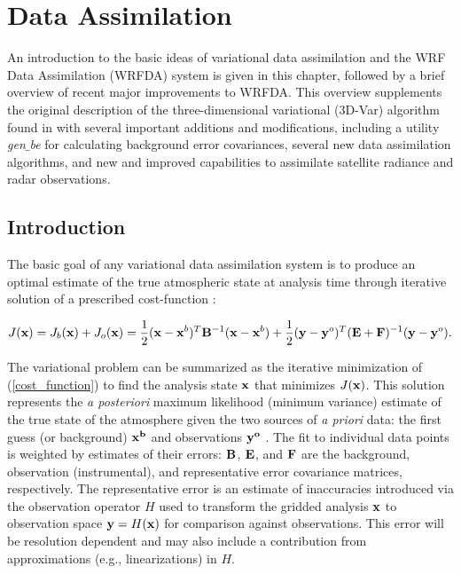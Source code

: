 \chapter{Data Assimilation}
\label{var_chap}

An introduction to the basic ideas of variational data assimilation and
the WRF Data Assimilation (WRFDA) system \citep{barker12} is given in this chapter, followed by a brief
overview of recent major improvements to WRFDA.  This overview
supplements the original description of the three-dimensional
variational (3D-Var) algorithm found in \citet{barker04} with
several important additions and modifications, including a utility {\it gen$\_$be}
for calculating background error covariances, several new data assimilation algorithms, and
new and improved capabilities to assimilate satellite radiance and radar observations.

\section{Introduction}
\label{var-intro}

The basic goal of any variational data assimilation system is to produce
an optimal estimate of the true atmospheric state at analysis time
through iterative solution of a prescribed cost-function \citep{ide97}:

\begin{equation}
J({\bf x}) = J_b({\bf x}) + J_o({\bf x}) = \frac{1}{2 
} ({\bf x}-{\bf x}^{b})^{T}{\bf B}^{-1}({\bf x}-{\bf x}^{b}) + 
\frac{1}{2}
({\bf y}-{\bf y}^{o})^{T}({\bf E+F})^{-1}({\bf y}-{\bf y}^{o}).
\label{cost_function}
\end{equation}

The variational problem can be summarized as the iterative minimization
of (\ref{cost_function}) to find the analysis state ${\bf x}$ that
minimizes $J({\bf x})$. This solution represents the {\it a posteriori}
maximum likelihood (minimum variance) estimate of the true state of the
atmosphere given the two sources of {\it a priori} data: the first guess
(or background) ${\bf x^{b}}$ and observations ${\bf y^{o}}$
\citep{lorenc86}. The fit to individual data points is weighted by
estimates of their errors: ${\bf B}$, ${\bf E}$, and ${\bf F}$ are the
background, observation (instrumental), and representative error
covariance matrices, respectively. The representative error is an estimate of
inaccuracies introduced via the observation operator $H$ used to
transform the gridded analysis ${\bf x}$ to observation space ${\bf
y}=H({\bf x})$ for comparison against observations. This error will be
resolution dependent and may also include a contribution from
approximations (e.g., linearizations) in $H$.

